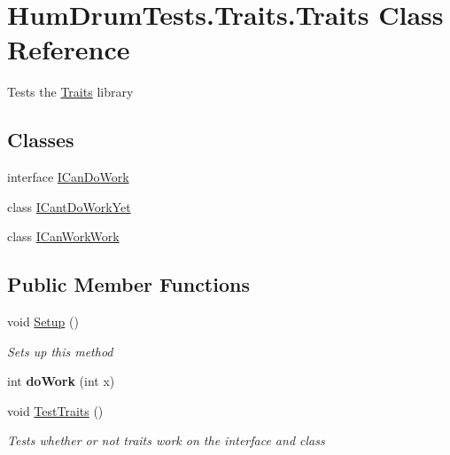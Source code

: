 \hypertarget{classHumDrumTests_1_1Traits_1_1Traits}{}\section{Hum\+Drum\+Tests.\+Traits.\+Traits Class Reference}
\label{classHumDrumTests_1_1Traits_1_1Traits}


Tests the \hyperlink{classHumDrumTests_1_1Traits_1_1Traits}{Traits} library  


\subsection*{Classes}
\begin{DoxyCompactItemize}
\item 
interface \hyperlink{interfaceHumDrumTests_1_1Traits_1_1Traits_1_1ICanDoWork}{I\+Can\+Do\+Work}
\item 
class \hyperlink{classHumDrumTests_1_1Traits_1_1Traits_1_1ICantDoWorkYet}{I\+Cant\+Do\+Work\+Yet}
\item 
class \hyperlink{classHumDrumTests_1_1Traits_1_1Traits_1_1ICanWorkWork}{I\+Can\+Work\+Work}
\end{DoxyCompactItemize}
\subsection*{Public Member Functions}
\begin{DoxyCompactItemize}
\item 
void \hyperlink{classHumDrumTests_1_1Traits_1_1Traits_aa635ce010edebd450a9e0373b5e070a0}{Setup} ()
\begin{DoxyCompactList}\small\item\em Sets up this method \end{DoxyCompactList}\item 
\hypertarget{classHumDrumTests_1_1Traits_1_1Traits_af2e499d30fa5d72b8469d1d76b4c27aa}{}int {\bfseries do\+Work} (int x)\label{classHumDrumTests_1_1Traits_1_1Traits_af2e499d30fa5d72b8469d1d76b4c27aa}

\item 
void \hyperlink{classHumDrumTests_1_1Traits_1_1Traits_a19d7693f6b79d0b729260114083606ff}{Test\+Traits} ()
\begin{DoxyCompactList}\small\item\em Tests whether or not traits work on the interface and class \end{DoxyCompactList}\end{DoxyCompactItemize}


